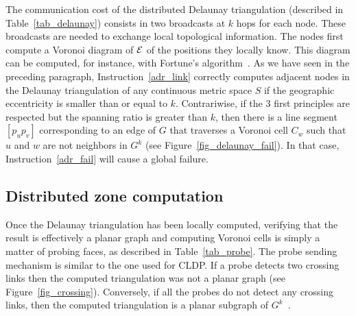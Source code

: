 \documentclass{article}
\newcommand{\englobing}{{\cal E}}
\begin{document}
The communication cost of the distributed Delaunay triangulation (described in Table~\ref{tab_delaunay}) consists in two broadcasts at $k$ hops for each node. These broadcasts are needed to exchange local topological information. The nodes first compute a Voronoi diagram of $\englobing$ of the positions they locally know. This diagram can be computed, for instance, with Fortune's algorithm~\cite{bib_fortune}. As we have seen in the preceding paragraph, Instruction~\ref{adr_link} correctly computes adjacent nodes in the Delaunay triangulation of any continuous metric space $S$ if the geographic eccentricity is smaller than or equal to $k$. Contrariwise, if the 3 first principles are respected but the spanning ratio is greater than $k$, then there is a line segment $[p_up_v]$ corresponding to an edge of $G$ that traverses a Voronoi cell $C_w$ such that $u$ and $w$ are not neighbors in $G^k$ (see Figure~\ref{fig_delaunay_fail}). In that case, Instruction~\ref{adr_fail} will cause a global failure.

\subsection{Distributed zone computation}
\label{sub_dist_voronoi}

Once the Delaunay triangulation has been locally computed, verifying that the result is effectively a planar graph and computing Voronoi cells is simply a matter of probing faces, as described in Table~\ref{tab_probe}. The probe sending mechanism is similar to the one used for CLDP. If a probe detects two crossing links then the computed triangulation was not a planar graph (see Figure~\ref{fig_crossing}). Conversely, if all the probes do not detect any crossing links, then the computed triangulation is a planar subgraph of $G^k$~\cite{bib_cldp}.
\end{document}
